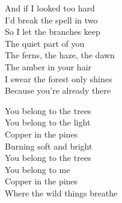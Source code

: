 \begin{lyrics}
And if I looked too hard\\
I’d break the spell in two\\
So I let the branches keep\\
The quiet part of you\\
The ferns, the haze, the dawn\\
The amber in your hair\\
I swear the forest only shines\\
Because you’re already there

You belong to the trees\\
You belong to the light\\
Copper in the pines\\
Burning soft and bright\\
You belong to the trees\\
You belong to me\\
Copper in the pines\\
Where the wild things breathe
\end{lyrics}

